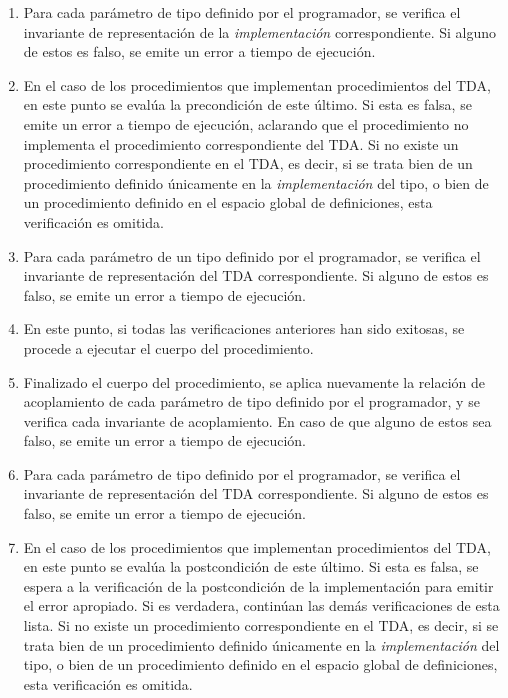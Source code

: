 {{\begin{enumerate}
  \item Para cada parámetro de tipo definido por el programador, se verifica
  el invariante de representación de la \textit{implementación} correspondiente.
  Si alguno de estos es falso, se emite un error a tiempo de ejecución.

  \item En el caso de los procedimientos que implementan procedimientos del TDA,
  en este punto se evalúa la precondición de este último. Si esta es falsa, se
  emite un error a tiempo de ejecución, aclarando que el procedimiento no
  implementa el procedimiento correspondiente del TDA. Si no existe un procedimiento
  correspondiente en el TDA, es decir, si se trata bien de un procedimiento
  definido únicamente en la \textit{implementación} del tipo, o bien de un
  procedimiento definido en el espacio global de definiciones, esta verificación
  es omitida.

  \item Para cada parámetro de un tipo definido por el programador, se verifica
  el invariante de representación del TDA correspondiente. Si alguno de estos es
  falso, se emite un error a tiempo de ejecución.

  \item En este punto, si todas las verificaciones anteriores han sido exitosas,
  se procede a ejecutar el cuerpo del procedimiento.

  \item Finalizado el cuerpo del procedimiento, se aplica nuevamente la relación
  de acoplamiento de cada parámetro de tipo definido por el programador, y se
  verifica cada invariante de acoplamiento. En caso de que alguno de estos sea
  falso, se emite un error a tiempo de ejecución.

  \item Para cada parámetro de tipo definido por el programador, se verifica el
  invariante de representación del TDA correspondiente. Si alguno de estos es
  falso, se emite un error a tiempo de ejecución.

  \item En el caso de los procedimientos que implementan
  procedimientos del TDA, en este punto se evalúa la postcondición de este
  último. Si esta es falsa, se espera a la verificación de la postcondición de la
  implementación para emitir el error apropiado. Si es verdadera, continúan las
  demás verificaciones de esta lista. Si no existe un procedimiento
  correspondiente en el TDA, es decir, si se trata bien de un procedimiento
  definido únicamente en la \textit{implementación} del tipo, o bien de un
  procedimiento definido en el espacio global de definiciones, esta verificación
  es omitida.


\end{enumerate}}}
